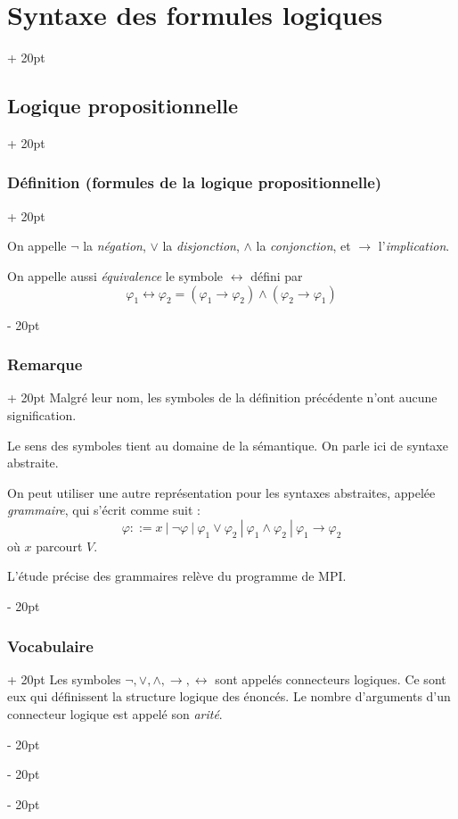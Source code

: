 \documentclass[a4paper, 12pt, twoside]{article}
\newcommand{\ind}[1][20pt]{\advance\leftskip + #1}
\newcommand{\deind}[1][20pt]{\advance\leftskip - #1}
\newenvironment{indt}[2][20pt]{#2 \par \ind[#1]}{\par \deind} %
\begin{document}
\begin{indt}{\section{Syntaxe des formules logiques}}
\begin{indt}{\subsection{Logique propositionnelle}}
\begin{indt}{\subsubsection{Définition (formules de la logique propositionnelle)}}
                \vspace{6pt}
                
                On appelle $\neg$ la \textit{négation}, $\vee$ la \textit{disjonction}, $\wedge$ la \textit{conjonction}, et $\rightarrow$ l'\textit{implication}.
                
                On appelle aussi \textit{équivalence} le symbole $\leftrightarrow$ défini par
                    \[ \varphi_1 \leftrightarrow \varphi_2 = (\varphi_1 \rightarrow \varphi_2) \wedge (\varphi_2 \rightarrow \varphi_1) \]
            \end{indt}
            
            \vspace{12pt}
            
            \begin{indt}{\subsubsection{Remarque}}
                Malgré leur nom, les symboles de la définition précédente n'ont aucune signification.
                
                Le sens des symboles tient au domaine de la sémantique. On parle ici de syntaxe abstraite.
                
                On peut utiliser une autre représentation pour les syntaxes abstraites, appelée \textit{grammaire}, qui s'écrit comme suit :
                    \[
                        \varphi ::= x \
                        |\ \neg \varphi\
                        |\ \varphi_1 \vee \varphi_2\
                        |\ \varphi_1 \wedge \varphi_2\
                        |\ \varphi_1 \rightarrow \varphi_2
                    \]
                où $x$ parcourt $V$.
                
                L'étude précise des grammaires relève du programme de MPI.
            \end{indt}
            
            \vspace{12pt}
            
            \begin{indt}{\subsubsection{Vocabulaire}}
                Les symboles $\neg, \vee, \wedge, \rightarrow, \leftrightarrow$ sont appelés connecteurs logiques. Ce sont eux qui définissent la structure logique des énoncés. Le nombre d'arguments d'un connecteur logique est appelé son \textit{arité}.
            \end{indt}
            

\end{indt}
\end{indt}
\end{document}
